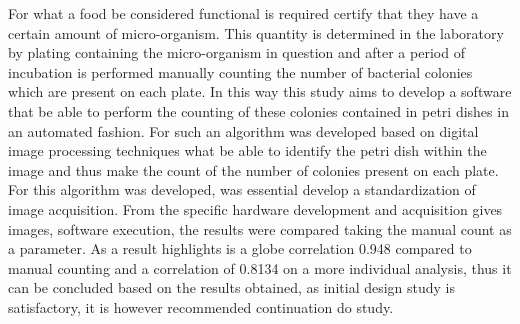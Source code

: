 For what a food be considered functional is required certify that they have a certain amount of micro-organism. This quantity is determined in the laboratory by plating containing the micro-organism in question and after a period of incubation is performed manually counting the number of bacterial colonies which are present on each plate. In this way this study aims to develop a software that be able to perform the counting of these colonies contained in petri dishes in an automated fashion. For such an algorithm was developed based on digital image processing techniques what be able to identify the petri dish within the image and thus make the count of the number of colonies present on each plate. For this algorithm was developed, was essential develop a standardization of image acquisition. From the specific hardware development and acquisition gives images, software execution, the results were compared taking the manual count as a parameter. As a result highlights is a globe correlation 0.948 compared to manual counting and a correlation of 0.8134 on a more individual analysis, thus it can be concluded based on the results obtained, as initial design study is satisfactory, it is however recommended continuation do study.